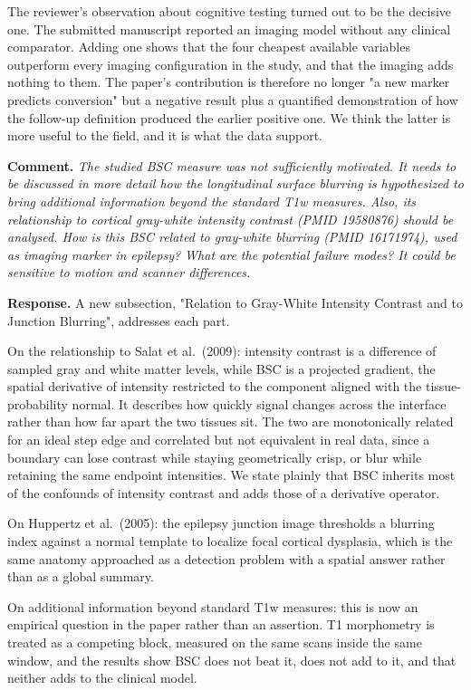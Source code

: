 \documentclass[11pt]{article}
\newcommand{\comment}[1]{\vspace{6pt}\noindent\textbf{Comment.} \textit{#1}\par\vspace{2pt}}
\newcommand{\response}{\noindent\textbf{Response.} }
\begin{document}
The reviewer's observation about cognitive testing turned out to be the decisive one. The submitted manuscript reported an imaging model without any clinical comparator. Adding one shows that the four cheapest available variables outperform every imaging configuration in the study, and that the imaging adds nothing to them. The paper's contribution is therefore no longer "a new marker predicts conversion" but a negative result plus a quantified demonstration of how the follow-up definition produced the earlier positive one. We think the latter is more useful to the field, and it is what the data support.

\comment{The studied BSC measure was not sufficiently motivated. It needs to be discussed in more detail how the longitudinal surface blurring is hypothesized to bring additional information beyond the standard T1w measures. Also, its relationship to cortical gray-white intensity contrast (PMID 19580876) should be analysed. How is this BSC related to gray-white blurring (PMID 16171974), used as imaging marker in epilepsy? What are the potential failure modes? It could be sensitive to motion and scanner differences.}

\response A new subsection, "Relation to Gray-White Intensity Contrast and to Junction Blurring", addresses each part.

On the relationship to Salat et al.\ (2009): intensity contrast is a difference of sampled gray and white matter levels, while BSC is a projected gradient, the spatial derivative of intensity restricted to the component aligned with the tissue-probability normal. It describes how quickly signal changes across the interface rather than how far apart the two tissues sit. The two are monotonically related for an ideal step edge and correlated but not equivalent in real data, since a boundary can lose contrast while staying geometrically crisp, or blur while retaining the same endpoint intensities. We state plainly that BSC inherits most of the confounds of intensity contrast and adds those of a derivative operator.

On Huppertz et al.\ (2005): the epilepsy junction image thresholds a blurring index against a normal template to localize focal cortical dysplasia, which is the same anatomy approached as a detection problem with a spatial answer rather than as a global summary.

On additional information beyond standard T1w measures: this is now an empirical question in the paper rather than an assertion. T1 morphometry is treated as a competing block, measured on the same scans inside the same window, and the results show BSC does not beat it, does not add to it, and that neither adds to the clinical model.
\end{document}
